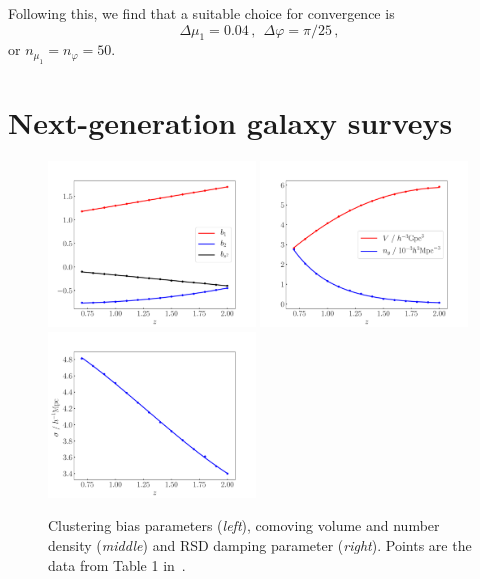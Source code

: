 %
Following this, we find that a suitable choice for convergence is
\begin{equation}\label{ori}
\Delta \mu_{1}=0.04\,,~~ \Delta\varphi= \pi/25 \,,
\end{equation}
or $n_{\mu_{1}}= n_{\varphi}=50$.

\section{Next-generation galaxy surveys}
%
\begin{figure}[!ht]
\centering
\includegraphics[width=0.49\textwidth]{fig/b-eps-converted-to}
\includegraphics[width=0.49\textwidth]{fig/V_n-eps-converted-to} 
\includegraphics[width=0.49\textwidth]{fig/sigma-eps-converted-to}
\caption{Clustering bias parameters ({\em left}), comoving volume and number density ({\em middle}) and RSD damping parameter ({\em right}). Points are the data from Table 1 in~\cite{Yankelevich:2018uaz}.}
\label{fig1}
\end{figure}
